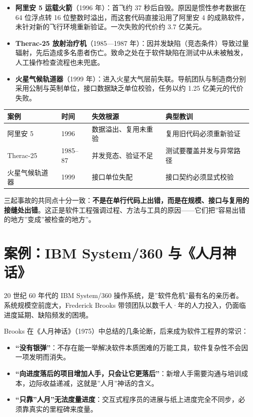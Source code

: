 \documentclass[12pt,a4paper,twoside,openany]{ctexbook}
\numberwithin{figure}{chapter}
\numberwithin{table}{chapter}
\providecommand{\tightlist}{\setlength{\itemsep}{0pt}\setlength{\parskip}{0pt}}
\newcounter{none}
\begin{document}
\begin{itemize}
\tightlist
\item
  \textbf{阿里安 5 运载火箭}（1996 年）：首飞约 37
  秒后自毁。原因是惯性参考数据在 64 位浮点转 16
  位整数时溢出，而这套代码直接沿用了阿里安 4
  的成熟软件，未针对新的飞行环境重新验证。一次失败的代价约 3.7 亿美元。
\item
  \textbf{Therac-25 放射治疗机}（1985---1987
  年）：因并发缺陷（竞态条件）导致过量辐射，先后造成多名患者伤亡。致命之处在于软件缺陷在测试中从未被触发，人工操作检查流程也未兜底。
\item
  \textbf{火星气候轨道器}（1999
  年）：进入火星大气层前失联。导航团队与制造商分别采用公制与英制单位，接口数据缺乏单位校验，任务以约
  1.25 亿美元的代价失败。
\end{itemize}

{\def\LTcaptype{none} %
\begin{longtable}[]{@{}llll@{}}
\toprule\noalign{}
案例 & 时间 & 失效根源 & 典型教训 \\
\midrule\noalign{}
\endhead
\bottomrule\noalign{}
\endlastfoot
阿里安 5 & 1996 & 数据溢出、复用未重验 & 复用旧代码必须重新验证 \\
Therac-25 & 1985--87 & 并发竞态、验证不足 & 测试要覆盖并发与异常路径 \\
火星气候轨道器 & 1999 & 接口单位失配 & 接口契约必须显式校验 \\
\end{longtable}
}

三起事故的共同点十分一致：\textbf{不是在单行代码上出错，而是在规模、接口与复用的接缝处出错}。这正是软件工程强调过程、方法与工具的原因------它们把''容易出错的地方''变成''被检查的地方''。

\section{案例：IBM System/360
与《人月神话》}\label{ux6848ux4f8bibm-system360-ux4e0eux4ebaux6708ux795eux8bdd}

20 世纪 60 年代的 IBM System/360
操作系统，是''软件危机''最有名的亲历者。系统规模空前庞大，Frederick
Brooks 带领团队以数千人·年的人力投入，仍面临进度延期、缺陷频发的困境。

Brooks
在《人月神话》（1975）中总结的几条论断，后来成为软件工程界的常识：

\begin{itemize}
\tightlist
\item
  \textbf{``没有银弹''}：不存在能一举解决软件本质困难的万能工具，软件复杂性不会因一项发明而消失。
\item
  \textbf{``向进度落后的项目增加人手，只会让它更落后''}：新增人手需要沟通与培训成本，边际收益递减，这就是''人月''神话的含义。
\item
  \textbf{``只靠''人月''无法度量进度}：交互式程序员的进展与纸上进度完全不同步，必须靠真实的里程碑来度量。
\end{itemize}
\end{document}
